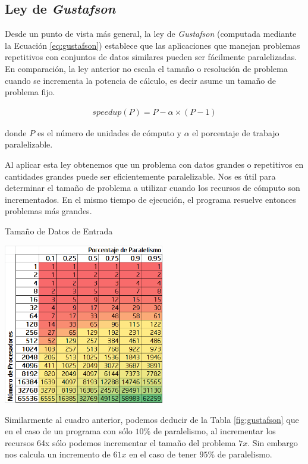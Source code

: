 \documentclass[a4paper]{report}
\begin{document}
\subsection{Ley de {\it Gustafson}}

Desde un punto de vista más general, la ley de {\it Gustafson}
\cite{gustafson} (computada mediante la Ecuación \ref{eq:gustafson})
establece que las aplicaciones que manejan problemas
repetitivos con conjuntos de datos similares pueden ser fácilmente
paralelizadas. En comparación, la ley anterior no escala el tamaño o
resolución de problema cuando se incrementa la potencia de cálculo, es
decir asume un tamaño de problema fijo. 

\begin{eqnarray}
\label{eq:gustafson}
speedup(P) = P - \alpha \times ( P - 1)
\end{eqnarray}

donde $ P $ es el número de unidades de cómputo y $ \alpha $ el porcentaje de trabajo paralelizable.

\bigskip

Al aplicar esta ley obtenemos que un problema con datos grandes o repetitivos en cantidades grandes puede ser eficientemente paralelizable. Nos es útil para determinar el tamaño de problema a utilizar cuando los recursos de cómputo son incrementados.
En el mismo tiempo de ejecución, el programa resuelve entonces problemas más grandes.

\begin{table}[H]
\caption{Tamaño de Datos de Entrada}
\label{fig:gustafson}
\centering
\includegraphics[width=7cm]{gustafson.png}
\end{table}

Similarmente al cuadro anterior, podemos deducir de la Tabla \ref{fig:gustafson} que en el caso de un programa con sólo $ 10\% $ de paralelismo, al incrementar los recursos 64x sólo podemos incrementar el tamaño del problema $ 7x $. Sin embargo nos calcula
un incremento de $ 61x $ en el caso de tener $ 95\% $ de paralelismo.
\end{document}
